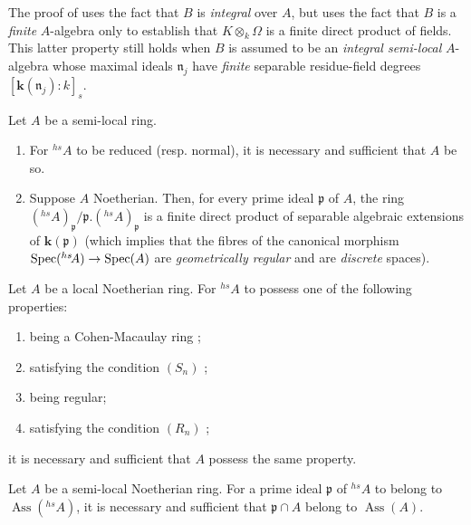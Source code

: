 \begin{remark}[18.8.11]
\label{IV.18.8.11}
The proof of  uses the fact that $B$ is \emph{integral} over $A$, but uses the fact that $B$ is a \emph{finite} $A$-algebra only to establish that $K\otimes_k\Omega$ is a finite direct product of fields.
This latter property still holds when $B$ is assumed to be an \emph{integral semi-local} $A$-algebra whose maximal ideals $\mathfrak{n}_j$ have \emph{finite} separable residue-field degrees $[\boldsymbol{k}(\mathfrak{n}_j):k]_s$.
\end{remark}

\begin{proposition}[18.8.12]
\label{IV.18.8.12}
Let $A$ be a semi-local ring.
\begin{enumerate}[label=\emph{\roman*)}]
  \item For ${}^{hs}\!A$ to be reduced \textup{(resp.} normal\textup{)}, it is necessary and sufficient that $A$ be so.
  \item Suppose $A$ Noetherian.
  Then, for every prime ideal $\mathfrak{p}$ of $A$, the ring $({}^{hs}\!A)_{\mathfrak{p}}/\mathfrak{p}.({}^{hs}\!A)_{\mathfrak{p}}$ is a finite direct product of separable algebraic extensions of $\boldsymbol{k}(\mathfrak{p})$ \textup{(which implies that the fibres of the canonical morphism $\operatorname{Spec}({}^{hs}\!A)\to\operatorname{Spec}(A)$ are \emph{geometrically regular} and are \emph{discrete} spaces)}.
\end{enumerate}
\end{proposition}

\begin{corollary}[18.8.13]
\label{IV.18.8.13}
Let $A$ be a local Noetherian ring.
For ${}^{hs}\!A$ to possess one of the following properties:
\begin{enumerate}[label=\emph{\alph*)}]
  \item being a Cohen-Macaulay ring ;
  \item satisfying the condition $(S_n)$ ;
  \item being regular;
  \item satisfying the condition $(R_n)$ ;
\end{enumerate}
it is necessary and sufficient that $A$ possess the same property.
\end{corollary}

\begin{corollary}[18.8.14]
\label{IV.18.8.14}
Let $A$ be a semi-local Noetherian ring.
For a prime ideal $\mathfrak{p}$ of ${}^{hs}\!A$ to belong to $\operatorname{Ass}({}^{hs}\!A)$, it is necessary and sufficient that $\mathfrak{p}\cap A$ belong to $\operatorname{Ass}(A)$.
\end{corollary}

